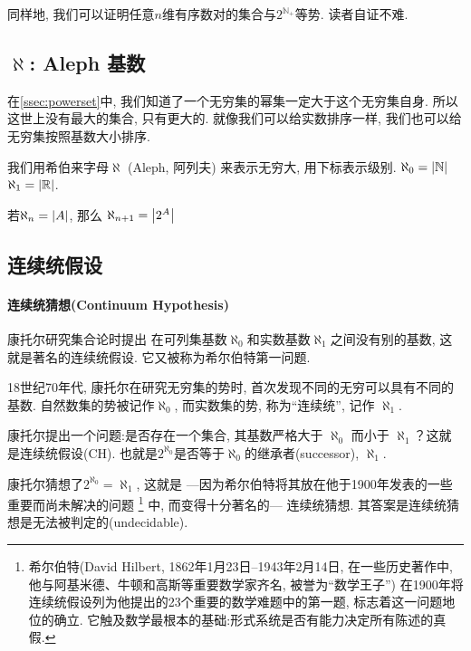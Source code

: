 \documentclass[UTF8]{mathrep}
\begin{document}
同样地, 我们可以证明任意$n$维有序数对的集合与$2^{\mathbb{N}_+} $等势. 读者自证不难.

\subsection{\texorpdfstring{$\aleph $: Aleph 基数}{Aleph 基数}}

在\cref{ssec:powerset}中, 我们知道了一个无穷集的幂集一定大于这个无穷集自身. 所以这世上没有最大的集合, 只有更大的.
就像我们可以给实数排序一样, 我们也可以给无穷集按照基数大小排序.

我们用希伯来字母$\aleph$ (Aleph, 阿列夫) 来表示无穷大, 用下标表示级别. $\aleph_0 = \left\lvert \mathbb{N} \right\rvert$
$\aleph_1 = \left\lvert \mathbb{R} \right\rvert$.

\begin{definition}[无穷基数]
  若$\aleph_n =\left\lvert A \right\rvert$, 那么 $\aleph_{n+1} = \left\lvert 2^{A}  \right\rvert$
\end{definition}

\subsection{连续统假设}

\paragraph{连续统猜想(Continuum Hypothesis)}
康托尔研究集合论时提出
在可列集基数$\aleph_0$和实数基数$\aleph_{1}$之间没有别的基数, 这就是著名的连续统假设. 它又被称为希尔伯特第一问题.

\begin{note}
  18世纪70年代, 康托尔在研究无穷集的势时,
  首次发现不同的无穷可以具有不同的基数.
  自然数集的势被记作$\aleph_{0}$, 而实数集的势, 称为“连续统”, 记作 $\aleph_{1}$.

  康托尔提出一个问题:是否存在一个集合, 其基数严格大于 $\aleph_{0}$ 而小于 $\aleph_{1}$？这就是连续统假设(CH).
  也就是$2^{\aleph_0}$是否等于$\aleph_0$的继承者(successor), $\aleph_1$.

  康托尔猜想了$2^{\aleph_0}=\aleph_1$, 这就是
  ---因为希尔伯特将其放在他于1900年发表的一些重要而尚未解决的问题
  \footnote{希尔伯特(David Hilbert, 1862年1月23日--1943年2月14日,
    在一些历史著作中, 他与阿基米德、牛顿和高斯等重要数学家齐名, 被誉为“数学王子”)
    在1900年将连续统假设列为他提出的23个重要的数学难题中的第一题,
  标志着这一问题地位的确立. 它触及数学最根本的基础:形式系统是否有能力决定所有陈述的真假. }
  中, 而变得十分著名的---
  连续统猜想.
  其答案是连续统猜想是无法被判定的(undecidable).
\end{note}
\end{document}
